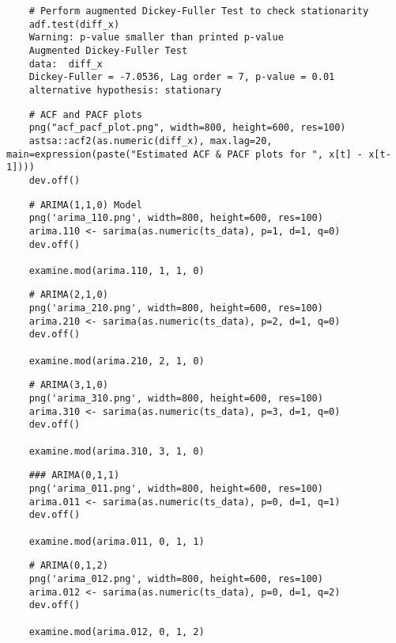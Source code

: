 \begin{lstlisting}
    # Perform augmented Dickey-Fuller Test to check stationarity
    adf.test(diff_x)
    Warning: p-value smaller than printed p-value
    Augmented Dickey-Fuller Test
    data:  diff_x
    Dickey-Fuller = -7.0536, Lag order = 7, p-value = 0.01
    alternative hypothesis: stationary
\end{lstlisting}

\begin{lstlisting}
    # ACF and PACF plots
    png("acf_pacf_plot.png", width=800, height=600, res=100)
    astsa::acf2(as.numeric(diff_x), max.lag=20, main=expression(paste("Estimated ACF & PACF plots for ", x[t] - x[t-1])))
    dev.off()
\end{lstlisting}

\begin{lstlisting}
    # ARIMA(1,1,0) Model
    png('arima_110.png', width=800, height=600, res=100)
    arima.110 <- sarima(as.numeric(ts_data), p=1, d=1, q=0)
    dev.off()

    examine.mod(arima.110, 1, 1, 0)
\end{lstlisting}

\begin{lstlisting}
    # ARIMA(2,1,0)
    png('arima_210.png', width=800, height=600, res=100)
    arima.210 <- sarima(as.numeric(ts_data), p=2, d=1, q=0)
    dev.off()

    examine.mod(arima.210, 2, 1, 0)
\end{lstlisting}

\begin{lstlisting}
    # ARIMA(3,1,0)
    png('arima_310.png', width=800, height=600, res=100)
    arima.310 <- sarima(as.numeric(ts_data), p=3, d=1, q=0)
    dev.off()
    
    examine.mod(arima.310, 3, 1, 0)
\end{lstlisting}

\begin{lstlisting}
    ### ARIMA(0,1,1)
    png('arima_011.png', width=800, height=600, res=100)
    arima.011 <- sarima(as.numeric(ts_data), p=0, d=1, q=1)
    dev.off()
    
    examine.mod(arima.011, 0, 1, 1)
\end{lstlisting}

\begin{lstlisting}
    # ARIMA(0,1,2)
    png('arima_012.png', width=800, height=600, res=100)
    arima.012 <- sarima(as.numeric(ts_data), p=0, d=1, q=2)
    dev.off()
    
    examine.mod(arima.012, 0, 1, 2)
\end{lstlisting}

